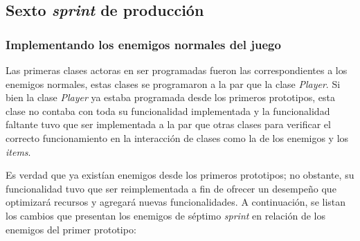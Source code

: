 \subsection{Sexto \textit{sprint} de producción}


\subsubsection{Implementando los enemigos normales del juego} 
Las primeras clases actoras en ser programadas fueron las correspondientes a los 
enemigos normales, estas clases se programaron a la par que la clase \textit{Player}. 
Si bien la clase \textit{Player} ya estaba programada desde los primeros prototipos, 
esta clase no contaba con toda su funcionalidad implementada y la funcionalidad 
faltante tuvo que ser implementada a la par que otras clases para verificar el 
correcto funcionamiento en la interacción de clases como la de los enemigos y los 
\textit{items}.
\\
\par 
Es verdad que ya existían enemigos desde los primeros prototipos; no obstante, 
su funcionalidad tuvo que ser reimplementada a fin de ofrecer un desempeño que 
optimizará recursos y agregará nuevas funcionalidades. A continuación, se listan los 
cambios que presentan los enemigos de séptimo \textit{sprint} en relación de los 
enemigos del primer prototipo: 

